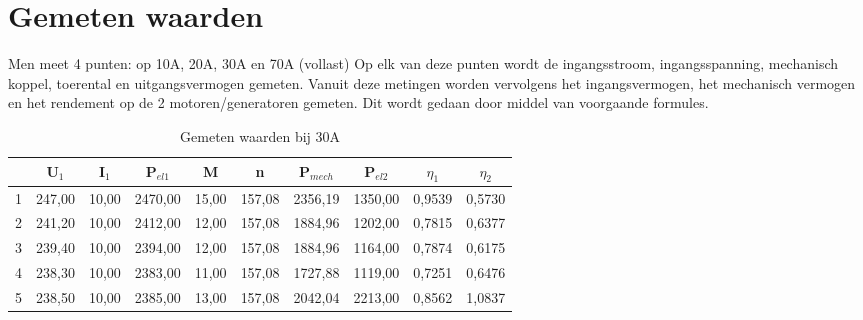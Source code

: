 \section{Gemeten waarden}

Men meet 4 punten: op 10A, 20A, 30A en 70A (vollast)
Op elk van deze punten wordt de ingangsstroom, ingangsspanning, mechanisch koppel,
toerental en uitgangsvermogen gemeten.
Vanuit deze metingen worden vervolgens het ingangsvermogen, het mechanisch vermogen
en het rendement op de 2 motoren/generatoren gemeten. Dit wordt gedaan door middel van
voorgaande formules.

\begin{table}[h]
  \caption{Gemeten waarden bij 30A}
  \begin{tabular}{| c | c | c | c | c | c | c | c | c | c |}
      \hline
        & U$_1$  & I$_1$ & P$_{el1}$ & M     & n      & P$_{mech}$& P$_{el2}$ &$\eta_1$&$\eta_2$\\ \hline
      1 & 247,00 & 10,00 & 2470,00 & 15,00 & 157,08 & 2356,19 & 1350,00 & 0,9539 & 0,5730 \\ \hline
      2 & 241,20 & 10,00 & 2412,00 & 12,00 & 157,08 & 1884,96 & 1202,00 & 0,7815 & 0,6377 \\ \hline
      3 & 239,40 & 10,00 & 2394,00 & 12,00 & 157,08 & 1884,96 & 1164,00 & 0,7874 & 0,6175 \\ \hline
      4 & 238,30 & 10,00 & 2383,00 & 11,00 & 157,08 & 1727,88 & 1119,00 & 0,7251 & 0,6476 \\ \hline
      5 & 238,50 & 10,00 & 2385,00 & 13,00 & 157,08 & 2042,04 & 2213,00 & 0,8562 & 1,0837 \\ \hline
  \end{tabular}
\end{table}


